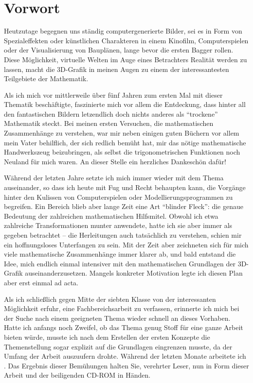 \chapter*{Vorwort}

Heutzutage begegnen uns ständig computergenerierte Bilder, sei es in Form von Spezialeffekten oder künstlichen Charakteren in einem Kinofilm, Computerspielen oder der Visualisierung von Bauplänen, lange bevor die ersten Bagger rollen. Diese Möglichkeit, virtuelle Welten im Auge eines Betrachters Realität werden zu lassen, macht die 3D-Grafik in meinen Augen zu einem der interessantesten Teilgebiete der Mathematik.

Als ich mich vor mittlerweile über fünf Jahren zum ersten Mal mit dieser Thematik beschäftigte, faszinierte mich vor allem die Entdeckung, dass hinter all den fantastischen Bildern letzendlich doch nichts anderes als \enquote{trockene} Mathematik steckt. Bei meinen ersten Versuchen, die mathematischen Zusammenhänge zu verstehen, war mir neben einigen guten Büchern vor allem mein Vater behilflich, der sich redlich bemüht hat, mir das nötige mathematische Handwerkszeug beizubringen, als selbst die trigonometrischen Funktionen noch Neuland für mich waren. An dieser Stelle ein herzliches Dankeschön dafür!

Während der letzten Jahre setzte ich mich immer wieder mit dem Thema auseinander, so dass ich heute mit Fug und Recht behaupten kann, die Vorgänge hinter den Kulissen von Computerspielen oder Modellierungsprogrammen zu begreifen. Ein Bereich blieb aber lange Zeit eine Art \enquote{blinder Fleck}: die genaue Bedeutung der zahlreichen mathematischen Hilfsmitel. Obwohl ich etwa zahlreiche Transformationen munter anwendete, hatte ich sie aber immer als gegeben betrachtet -- die Herleitungen auch tatsächlich zu verstehen, schien mir ein hoffnungsloses Unterfangen zu sein. Mit der Zeit aber zeichneten sich für mich viele mathematische Zusammenhänge immer klarer ab, und bald entstand die Idee, mich endlich einmal intensiver mit den mathematischen Grundlagen der 3D-Grafik auseinanderzusetzen. Mangels konkreter Motivation legte ich diesen Plan aber erst einmal ad acta.

Als ich schließlich gegen Mitte der siebten Klasse von der interessanten Möglichkeit erfuhr, eine Fachbereichsarbeit zu verfassen, erinnerte ich mich bei der Suche nach einem geeigneten Thema wieder schnell an dieses Vorhaben. Hatte ich anfangs noch Zweifel, ob das Thema genug Stoff für eine ganze Arbeit bieten würde, musste ich nach dem Erstellen der ersten Konzepte die Themenstellung sogar explizit auf die Grundlagen eingrenzen musste, da der Umfang der Arbeit auszuufern drohte. Während der letzten Monate arbeitete ich . Das Ergebnis dieser Bemühungen halten Sie, verehrter Leser, nun in Form dieser Arbeit und der beiligenden CD-ROM in Händen.

